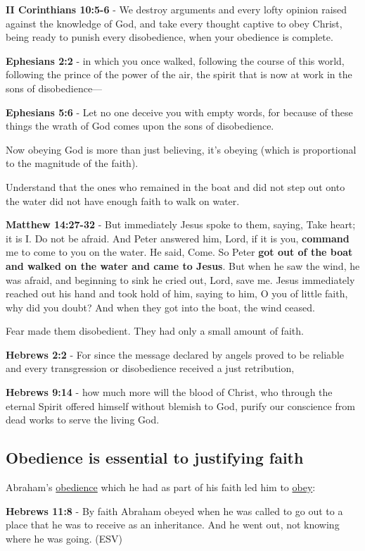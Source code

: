 \documentclass[11pt]{article}
\begin{document}
\textbf{II Corinthians 10:5-6} - We destroy arguments and every lofty opinion raised against the knowledge of God, and take every thought captive to obey Christ, being ready to punish every disobedience, when your obedience is complete.

\textbf{Ephesians 2:2} - in which you once walked, following the course of this world, following the prince of the power of the air, the spirit that is now at work in the sons of disobedience—

\textbf{Ephesians 5:6} - Let no one deceive you with empty words, for because of these things the wrath of God comes upon the sons of disobedience.

Now obeying God is more than just believing, it's obeying (which is proportional to the magnitude of the faith).

Understand that the ones who remained in the boat and did not step out onto the water did not have enough faith to walk on water.

\textbf{Matthew 14:27-32} - But immediately Jesus spoke to them, saying, Take heart; it is I. Do not be afraid. And Peter answered him, Lord, if it is you, \textbf{command} me to come to you on the water. He said, Come. So Peter \textbf{got out of the boat and walked on the water and came to Jesus}. But when he saw the wind, he was afraid, and beginning to sink he cried out, Lord, save me. Jesus immediately reached out his hand and took hold of him, saying to him, O you of little faith, why did you doubt? And when they got into the boat, the wind ceased.

Fear made them disobedient. They had only a small amount of faith.

\textbf{Hebrews 2:2} - For since the message declared by angels proved to be reliable and every transgression or disobedience received a just retribution,

\textbf{Hebrews 9:14} - how much more will the blood of Christ, who through the eternal Spirit offered himself without blemish to God, purify our conscience from dead works to serve the living God.

\subsection{Obedience is essential to justifying faith}
\label{sec:org22907fb}
Abraham's \uline{obedience} which he had as part of his faith led him to \uline{obey}:

\textbf{Hebrews 11:8} - By faith Abraham obeyed when he was called to go out to a place that he was to receive as an inheritance.  And he went out, not knowing where he was going. (ESV)
\end{document}
